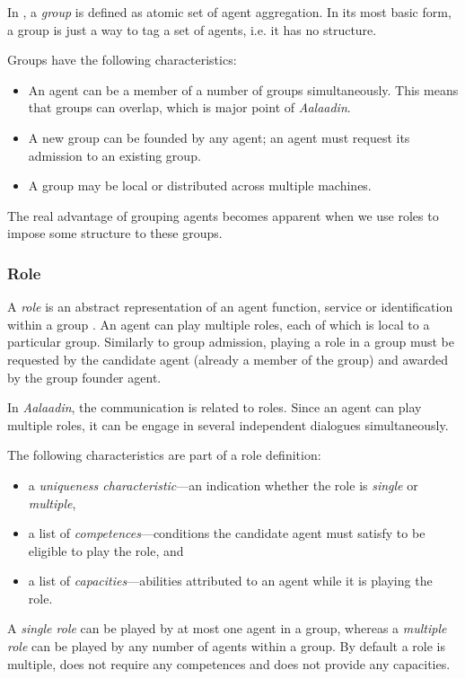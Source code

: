In \cite{Ferber97}, a \textit{group} is defined as atomic set of agent aggregation.
In its most basic form, a group is just a way to tag a set of agents, i.e. it has no structure.

Groups have the following characteristics:
\begin{itemize}
	\item An agent can be a member of a number of groups simultaneously.
	This means that groups can overlap, which is major point of \textit{Aalaadin}.
	\item A new group can be founded by any agent; an agent must request its admission to an existing group.
	\item A group may be local or distributed across multiple machines.
\end{itemize}

The real advantage of grouping agents becomes apparent when we use roles to impose some structure to these groups.

\subsubsection*{Role}

A \textit{role} is an abstract representation of an agent function, service or identification within a group \cite{Ferber97}.
An agent can play multiple roles, each of which is local to a particular group.
Similarly to group admission, playing a role in a group must be requested by the candidate agent (already a member of the group) and awarded by the group founder agent.

In \textit{Aalaadin}, the communication is related to roles. Since an agent can play multiple roles, it can be engage in several independent dialogues simultaneously.

The following characteristics are part of a role definition:
\begin{itemize}
	\item a \textit{uniqueness characteristic}---an indication whether the role is \textit{single} or \textit{multiple},
	\item a list of  \textit{competences}---conditions the candidate agent must satisfy to be eligible to play the role, and
	\item a list of \textit{capacities}---abilities attributed to an agent while it is playing the role.
\end{itemize}
A \textit{single role} can be played by at most one agent in a group, whereas a \textit{multiple role} can be played by any number of agents within a group.
By default a role is multiple, does not require any competences and does not provide any capacities.

